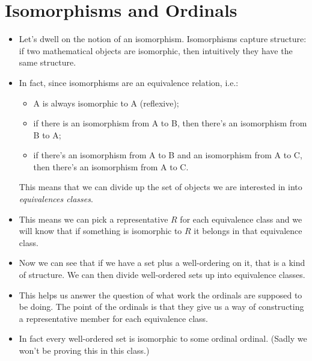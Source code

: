 \documentclass[justified]{tufte-handout}
\begin{document}
\section{Isomorphisms and Ordinals}

\begin{itemize}


\item Let's dwell on the notion of an isomorphism. Isomorphisms capture structure: if two mathematical objects are isomorphic, then intuitively they have the same structure.

\item In fact, since isomorphisms are an equivalence relation, i.e.: 


\begin{itemize}

\item A is always isomorphic to A (reflexive);

\item if there is an isomorphism from A to B, then there's an isomorphism from B to A;


\item if there's an isomorphism from A to B and an isomorphism from A to C, then there's an isomorphism from A to C.


\end{itemize}


 This means that we can divide up the set of objects we are interested in into \emph{equivalences classes}.

\item This means we can pick a representative $R$ for each equivalence class and we will know that if something is isomorphic to $R$ it belongs in that equivalence class.



\item Now we can see that if we have a set plus a well-ordering on it, that is a kind of structure. We can then divide well-ordered sets up into equivalence classes.


\item This helps us answer the question of what work the ordinals are supposed to be doing. The point of the ordinals is that they give us a way of constructing a representative member for each equivalence class.

\item In fact every well-ordered set is isomorphic to some ordinal ordinal. (Sadly we won't be proving this in this class.)


\end{itemize}
\end{document}
